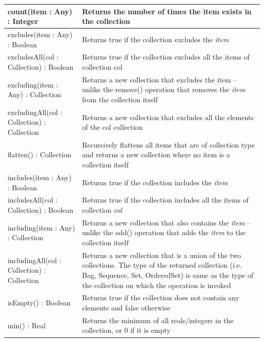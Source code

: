 \begin{longtabu} {|p{6.5cm}|X|}
    count(item : Any) : Integer & Returns the number of times the item exists in the collection \\\hline
    
    excludes(item : Any) : Boolean & Returns true if the collection excludes the \emph{item} \\\hline
    
    excludesAll(col : Collection) : Boolean & Returns true if the collection excludes all the items of collection col \\\hline
    
    excluding(item : Any) : Collection & Returns a new collection that excludes the item -- unlike the remove() operation that removes the \emph{item} from the collection itself\\\hline
    
    excludingAll(col : Collection) : Collection & Returns a new collection that excludes all the elements of the col collection \\\hline
    
    flatten() : Collection & Recursively flattens all items that are of collection type and returns a new collection where no item is a collection itself \\\hline
    
    includes(item : Any) : Boolean & Returns true if the collection includes the \emph{item} \\\hline
    
    includesAll(col : Collection) : Boolean & Returns true if the collection includes all the items of collection \emph{col} \\\hline
    
    including(item : Any) : Collection & Returns a new collection that also contains the \emph{item} -- unlike the add() operation that adds the \emph{item} to the collection itself  \\\hline
    
    includingAll(col : Collection) : Collection & Returns a new collection that is a union of the two collections. The type of the returned collection (i.e. Bag, Sequence, Set, OrderedSet) is same as the type of the collection on which the operation is invoked \\\hline
    
    isEmpty() : Boolean & Returns true if the collection does not contain any elements and false otherwise \\\hline

    min() : Real & Returns the minimum of all reals/integers in the collection, or 0 if it is empty \\\hline


\end{longtabu}
